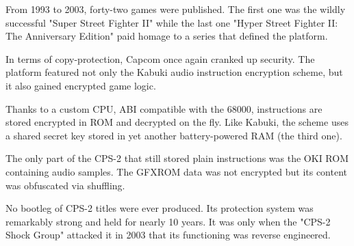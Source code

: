 From 1993 to 2003, forty-two games were published. The first one was the wildly successful "Super Street Fighter II" while the last one "Hyper Street Fighter II: The Anniversary Edition" paid homage to a series that defined the platform.

In terms of copy-protection, Capcom once again cranked up security. The platform featured not only the Kabuki audio instruction encryption scheme, but it also gained encrypted game logic. 

Thanks to a custom CPU, ABI compatible with the 68000, instructions are stored encrypted in ROM and decrypted on the fly. Like Kabuki, the scheme uses a shared secret key stored in yet another battery-powered RAM (the third one).

The only part of the CPS-2 that still stored plain instructions was the OKI ROM containing audio samples. The GFXROM data was not encrypted but its content was obfuscated via shuffling.

\begin{trivia}
No bootleg of CPS-2 titles were ever produced. Its protection system was remarkably strong and held for nearly 10 years. It was only when the "CPS-2 Shock Group" attacked it in 2003\cite{cps2rebirth} that its functioning was reverse engineered.
\end{trivia}



